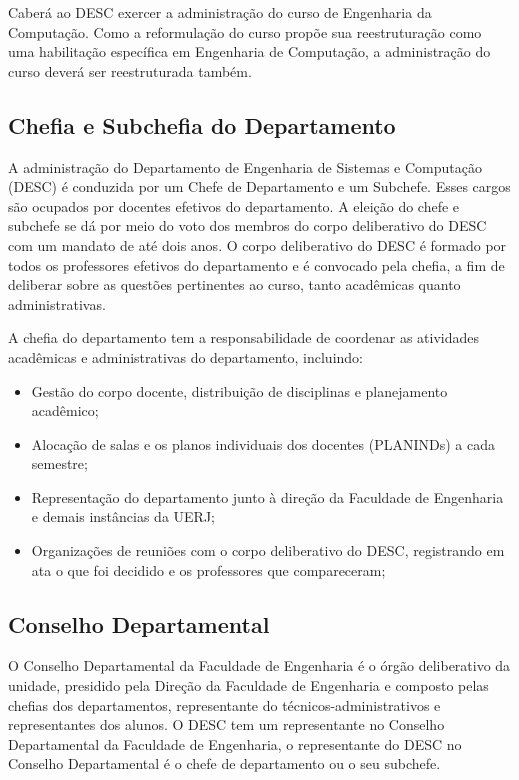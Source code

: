 Caberá ao DESC exercer a administração do curso de Engenharia da Computação.
Como a reformulação do curso propõe sua reestruturação como uma habilitação específica em Engenharia de Computação, a administração do curso deverá ser reestruturada também.

\subsection{Chefia e Subchefia do Departamento}

A administração do Departamento de Engenharia de Sistemas e Computação (DESC) é conduzida por um Chefe de Departamento e um Subchefe. Esses cargos são ocupados por docentes efetivos do departamento. A eleição do chefe e subchefe se dá por meio do voto dos membros do corpo deliberativo do DESC com um mandato de até dois anos. O corpo deliberativo do DESC é formado por todos os professores efetivos do departamento e é convocado pela chefia, a fim de deliberar sobre as questões pertinentes ao curso, tanto acadêmicas quanto administrativas.

A chefia do departamento tem a responsabilidade de coordenar as atividades acadêmicas e administrativas do departamento, incluindo:

\begin{itemize}
    \item Gestão do corpo docente, distribuição de disciplinas e planejamento acadêmico;
    \item Alocação de salas e os planos individuais dos docentes (PLANINDs) a cada semestre;
    \item Representação do departamento junto à direção da Faculdade de Engenharia e demais instâncias da UERJ;
    \item Organizações de reuniões com o corpo deliberativo do DESC, registrando em ata o que foi decidido e os professores que compareceram;
\end{itemize}

\subsection{Conselho Departamental}

O Conselho Departamental da Faculdade de Engenharia é o órgão deliberativo da unidade, presidido pela Direção da Faculdade de Engenharia e composto pelas chefias dos departamentos, representante do técnicos-administrativos e representantes dos alunos. O DESC tem um representante no Conselho Departamental da Faculdade de Engenharia, o representante do DESC no Conselho Departamental é o chefe de departamento ou o seu subchefe.


